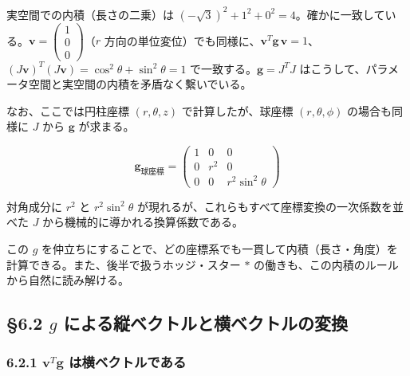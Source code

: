 \documentclass[a4paper,12pt,openany]{book}
\begin{document}
実空間での内積（長さの二乗）は
\((-\sqrt{3})^2 + 1^2 + 0^2 = 4\)。確かに一致している。\(\mathbf{v} = \begin{pmatrix}1 \\ 0 \\ 0\end{pmatrix}\)（\(r\)
方向の単位変位）でも同様に、\(\mathbf{v}^T \mathbf{g} \,\mathbf{v} = 1\)、\((J\mathbf{v})^T (J\mathbf{v}) = \cos^2\theta + \sin^2\theta = 1\)
で一致する。\(\mathbf{g} = J^T J\)
はこうして、パラメータ空間と実空間の内積を矛盾なく繫いでいる。

なお、ここでは円柱座標 \((r,\theta,z)\) で計算したが、球座標
\((r,\theta,\phi)\) の場合も同様に \(J\) から \(\mathbf{g}\) が求まる。

\[\mathbf{g}_{\text{球座標}} = \begin{pmatrix} 1 & 0 & 0 \\ 0 & r^2 & 0 \\ 0 & 0 & r^2\sin^2\theta \end{pmatrix}\]

対角成分に \(r^2\) と \(r^2\sin^2\theta\)
が現れるが、これらもすべて座標変換の一次係数を並べた \(J\)
から機械的に導かれる換算係数である。

この \(g\)
を仲立ちにすることで、どの座標系でも一貫して内積（長さ・角度）を計算できる。また、後半で扱うホッジ・スター
\(\ast\) の働きも、この内積のルールから自然に読み解ける。

\par\vspace{0.35em}\par

\hypertarget{g-ux306bux3088ux308bux7e26ux30d9ux30afux30c8ux30ebux3068ux6a2aux30d9ux30afux30c8ux30ebux306eux5909ux63db}{%
\subsection{\texorpdfstring{§6.2 \(g\)
による縦ベクトルと横ベクトルの変換}{§6.2 g による縦ベクトルと横ベクトルの変換}}\label{g-ux306bux3088ux308bux7e26ux30d9ux30afux30c8ux30ebux3068ux6a2aux30d9ux30afux30c8ux30ebux306eux5909ux63db}}

\hypertarget{mathbfvt-mathbfg-ux306fux6a2aux30d9ux30afux30c8ux30ebux3067ux3042ux308b}{%
\subsubsection{\texorpdfstring{6.2.1 \(\mathbf{v}^T \mathbf{g}\)
は横ベクトルである}{6.2.1 \textbackslash mathbf\{v\}\^{}T \textbackslash mathbf\{g\} は横ベクトルである}}\label{mathbfvt-mathbfg-ux306fux6a2aux30d9ux30afux30c8ux30ebux3067ux3042ux308b}}
\end{document}
